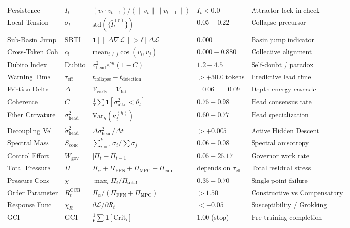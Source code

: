 \documentclass[11pt,a4paper]{article}
\begin{document}
\begin{longtable}{p{2.5cm} p{1.9cm} p{4.7cm} p{2.5cm} p{2.9cm}}
Persistence & $I_t$ & $(v_t \cdot v_{t-1})/(\|v_t\|\|v_{t-1}\|)$ & $I_t < 0.0$ & Attractor lock-in check \\
Local Tension & $\sigma_t$ & $\text{std}(\{\bar{I}_t^{(r)}\})$ & $0.05 - 0.22$ & Collapse precursor \\
Sub-Basin Jump & $\text{SBTI}$ & $\mathbf{1}[\|\Delta \nabla \mathcal{L}\|>\delta]\Delta \mathcal{L}$ & $0.000$ & Basin jump indicator \\
Cross-Token Coh & $c_l$ & $\text{mean}_{i\neq j} \cos(v_i, v_j)$ & $0.000 - 0.880$ & Collective alignment \\
Dubito Index & $\text{Dubito}$ & $\sigma^2_{\text{head}} e^{\gamma \kappa} (1-C)$ & $1.2 - 4.5$ & Self-doubt / paradox \\
Warning Time & $\tau_{\text{eff}}$ & $t_{\text{collapse}} - t_{\text{detection}}$ & $> +30.0$ tokens & Predictive lead time \\
Friction Delta & $\Delta$ & $\mathcal{V}_{\text{early}} - \mathcal{V}_{\text{late}}$ & $-0.06 - -0.09$ & Depth energy cascade \\
Coherence & $C$ & $\frac{1}{T}\sum \mathbf{1}[\sigma^2_{\text{attn}} < \theta_t]$ & $0.75 - 0.98$ & Head consensus rate \\
Fiber Curvature & $\sigma^2_{\text{head}}$ & $\text{Var}_h(\kappa_t^{(h)})$ & $0.60 - 0.77$ & Head specialization \\
Decoupling Vel & $\dot{\sigma}^2_{\text{head}}$ & $\Delta \sigma^2_{\text{head}} / \Delta t$ & $> +0.005$ & Active Hidden Descent \\
Spectral Mass & $S_{\text{conc}}$ & $\sum_{i=1}^k \sigma_i / \sum \sigma_j$ & $0.06 - 0.08$ & Spectral anisotropy \\
Control Effort & $\dot{W}_{\text{gov}}$ & $|\Pi_t - \Pi_{t-1}|$ & $0.05 - 25.17$ & Governor work rate \\
Total Pressure & $\Pi$ & $\Pi_\alpha + \Pi_{\text{FFN}} + \Pi_{\text{MPC}} + \Pi_{\text{cap}}$ & depends on $\tau_{\text{eff}}$ & Total residual stress \\
Pressure Conc & $\chi$ & $\max_i \Pi_i / \Pi_{\text{total}}$ & $0.35 - 0.70$ & Single point failure \\
Order Parameter & $R_t^{\text{CCR}}$ & $\Pi_\alpha / (\Pi_{\text{FFN}} + \Pi_{\text{MPC}})$ & $> 1.50$ & Constructive vs Compensatory \\
Response Func & $\chi_R$ & $\partial \mathcal{L} / \partial R_t$ & $< -0.05$ & Susceptibility / Grokking \\
GCI & $\text{GCI}$ & $\frac{1}{6}\sum \mathbf{1}[\text{Crit}_i]$ & $1.00$ (stop) & Pre-training completion \\

\end{longtable}
\end{document}
